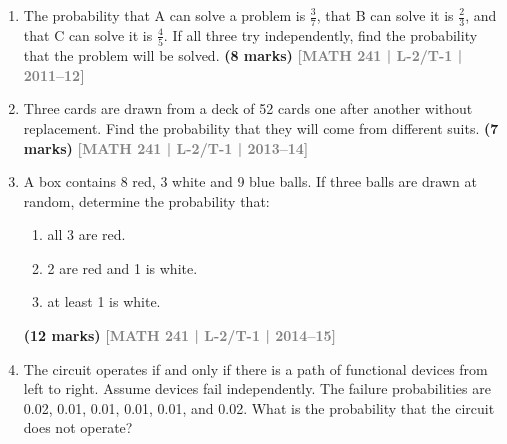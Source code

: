\documentclass[12pt,a4paper]{article}
\newcommand{\yr}[1]{\hfill\textcolor{gray}{\small\textbf{[#1]}}}
\newcommand{\mk}[1]{\textcolor{orange!70!black}{\small\textbf{(#1 marks)}}}
\begin{document}
\begin{enumerate}

\item The probability that A can solve a problem is $\tfrac{3}{7}$, that B can solve it is $\tfrac{2}{3}$, and that C can solve it is $\tfrac{4}{5}$. If all three try independently, find the probability that the problem will be solved.
\mk{8} \yr{MATH 241 | L-2/T-1 | 2011--12}

\item Three cards are drawn from a deck of 52 cards one after another without replacement. Find the probability that they will come from different suits.
\mk{7} \yr{MATH 241 | L-2/T-1 | 2013--14}

\item A box contains 8 red, 3 white and 9 blue balls. If three balls are drawn at random, determine the probability that:
\begin{enumerate}
  \item all 3 are red.
  \item 2 are red and 1 is white.
  \item at least 1 is white.
\end{enumerate}
\mk{12} \yr{MATH 241 | L-2/T-1 | 2014--15}

\item The circuit operates if and only if there is a path of functional devices from left to right. Assume devices fail independently. The failure probabilities are 0.02, 0.01, 0.01, 0.01, 0.01, and 0.02. What is the probability that the circuit does not operate?
\begin{center}
\end{center}
\end{enumerate}
\end{document}
